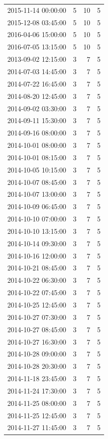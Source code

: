 \begin{tabular}{lrrr}
2015-11-14 00:00:00 & 5 & 10 & 5 \\
2015-12-08 03:45:00 & 5 & 10 & 5 \\
2016-04-06 15:00:00 & 5 & 10 & 5 \\
2016-07-05 13:15:00 & 5 & 10 & 5 \\
2013-09-02 12:15:00 & 3 & 7 & 5 \\
2014-07-03 14:45:00 & 3 & 7 & 5 \\
2014-07-22 16:45:00 & 3 & 7 & 5 \\
2014-08-20 12:45:00 & 3 & 7 & 5 \\
2014-09-02 03:30:00 & 3 & 7 & 5 \\
2014-09-11 15:30:00 & 3 & 7 & 5 \\
2014-09-16 08:00:00 & 3 & 7 & 5 \\
2014-10-01 08:00:00 & 3 & 7 & 5 \\
2014-10-01 08:15:00 & 3 & 7 & 5 \\
2014-10-05 10:15:00 & 3 & 7 & 5 \\
2014-10-07 08:45:00 & 3 & 7 & 5 \\
2014-10-07 13:00:00 & 3 & 7 & 5 \\
2014-10-09 06:45:00 & 3 & 7 & 5 \\
2014-10-10 07:00:00 & 3 & 7 & 5 \\
2014-10-10 13:15:00 & 3 & 7 & 5 \\
2014-10-14 09:30:00 & 3 & 7 & 5 \\
2014-10-16 12:00:00 & 3 & 7 & 5 \\
2014-10-21 08:45:00 & 3 & 7 & 5 \\
2014-10-22 06:30:00 & 3 & 7 & 5 \\
2014-10-22 07:45:00 & 3 & 7 & 5 \\
2014-10-25 12:45:00 & 3 & 7 & 5 \\
2014-10-27 07:30:00 & 3 & 7 & 5 \\
2014-10-27 08:45:00 & 3 & 7 & 5 \\
2014-10-27 16:30:00 & 3 & 7 & 5 \\
2014-10-28 09:00:00 & 3 & 7 & 5 \\
2014-10-28 20:30:00 & 3 & 7 & 5 \\
2014-11-18 23:45:00 & 3 & 7 & 5 \\
2014-11-24 17:30:00 & 3 & 7 & 5 \\
2014-11-25 08:00:00 & 3 & 7 & 5 \\
2014-11-25 12:45:00 & 3 & 7 & 5 \\
2014-11-27 11:45:00 & 3 & 7 & 5 \\

\end{tabular}
